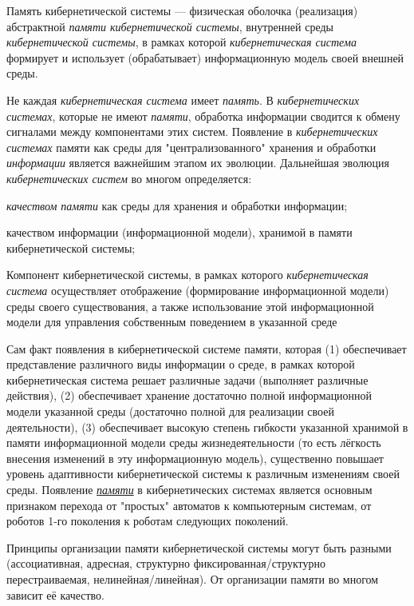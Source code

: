 Память кибернетической системы --- физическая оболочка (реализация) абстрактной \textit{памяти кибернетической системы}, внутренней среды \textit{кибернетической системы}, в рамках которой \textit{кибернетическая система} формирует и использует (обрабатывает) информационную модель своей внешней среды.

Не каждая \textit{кибернетическая система} имеет \textit{память}. 
В \textit{кибернетических системах}, которые не имеют \textit{памяти}, обработка информации сводится к обмену сигналами между компонентами этих систем. Появление в \textit{кибернетических системах} памяти как среды для "централизованного"{} хранения и обработки \textit{информации} является важнейшим этапом их эволюции. Дальнейшая эволюция \textit{кибернетических систем} во многом определяется:
\begin{textitemize}
	\item \textit{качеством памяти} как среды для хранения и обработки информации;
	\item качеством информации (информационной модели), хранимой в памяти кибернетической системы;
\end{textitemize}

Компонент кибернетической системы, в рамках которого \textit{кибернетическая система} осуществляет отображение (формирование информационной модели) среды своего существования, а также использование этой информационной модели для управления собственным поведением в указанной среде

Сам факт появления в кибернетической системе памяти, которая (1) обеспечивает представление различного виды информации о среде, в рамках которой кибернетическая система решает различные задачи (выполняет различные действия), (2) обеспечивает хранение достаточно полной информационной модели указанной среды (достаточно полной для реализации своей деятельности), (3) обеспечивает высокую степень гибкости указанной хранимой в памяти информационной модели среды жизнедеятельности (то есть лёгкость внесения изменений в эту информационную модель), существенно повышает уровень адаптивности кибернетической системы к различным изменениям своей среды.
Появление{} \uline{\textit{памяти}} в кибернетических системах является основным признаком перехода от "простых"{} автоматов к компьютерным системам, от роботов 1-го поколения к роботам следующих поколений.

Принципы организации памяти кибернетической системы могут быть разными (ассоциативная, адресная, структурно фиксированная/структурно перестраиваемая, нелинейная/линейная). 
От организации памяти во многом зависит её качество.

